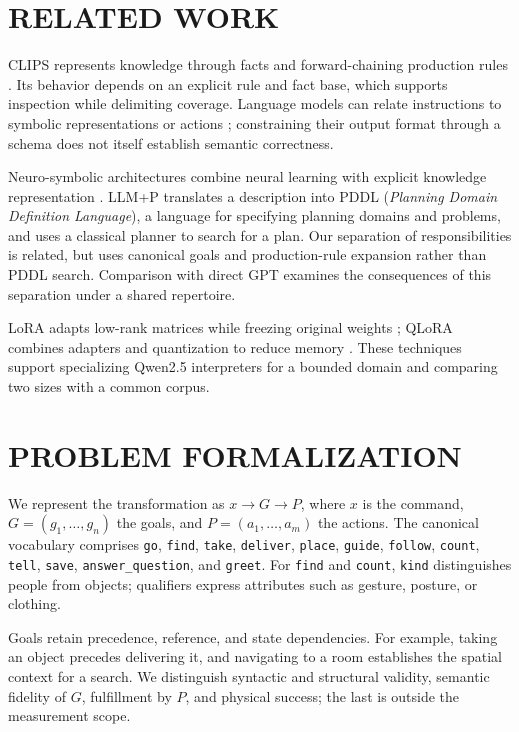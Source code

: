 \documentclass[a4paper,twoside]{article}
\begin{document}
\section{RELATED WORK}
CLIPS represents knowledge through facts and forward-chaining production rules \cite{NASA_CLIPS,Giarratano2005}. Its behavior depends on an explicit rule and fact base, which supports inspection while delimiting coverage. Language models can relate instructions to symbolic representations or actions \cite{Shi2023}; constraining their output format through a schema does not itself establish semantic correctness.

Neuro-symbolic architectures combine neural learning with explicit knowledge representation \cite{garcez2015neural,besold2017neural}. LLM+P \cite{liu2023llmp} translates a description into PDDL (\emph{Planning Domain Definition Language}), a language for specifying planning domains and problems, and uses a classical planner to search for a plan. Our separation of responsibilities is related, but uses canonical goals and production-rule expansion rather than PDDL search. Comparison with direct GPT examines the consequences of this separation under a shared repertoire.

LoRA adapts low-rank matrices while freezing original weights \cite{hu2022lora}; QLoRA combines adapters and quantization to reduce memory \cite{dettmers2023qlora}. These techniques support specializing Qwen2.5 interpreters \cite{yang2024qwen25} for a bounded domain and comparing two sizes with a common corpus.



\section{PROBLEM FORMALIZATION}
We represent the transformation as $x\rightarrow G\rightarrow P$, where $x$ is the command, $G=(g_1,\ldots,g_n)$ the goals, and $P=(a_1,\ldots,a_m)$ the actions. The canonical vocabulary comprises \texttt{go}, \texttt{find}, \texttt{take}, \texttt{deliver}, \texttt{place}, \texttt{guide}, \texttt{follow}, \texttt{count}, \texttt{tell}, \texttt{save}, \texttt{answer\_question}, and \texttt{greet}. For \texttt{find} and \texttt{count}, \texttt{kind} distinguishes people from objects; qualifiers express attributes such as gesture, posture, or clothing.

Goals retain precedence, reference, and state dependencies. For example, taking an object precedes delivering it, and navigating to a room establishes the spatial context for a search. We distinguish syntactic and structural validity, semantic fidelity of $G$, fulfillment by $P$, and physical success; the last is outside the measurement scope.
\end{document}
